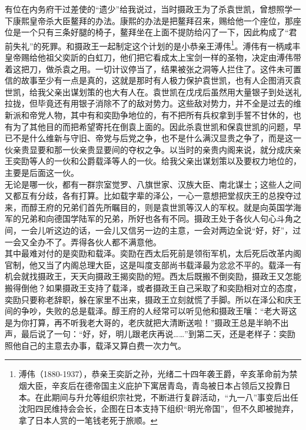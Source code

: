 有位在内务府干过差使的“遗少”给我说过，当时摄政王为了杀袁世凯，曾想照学一下康熙皇帝杀大臣鳌拜的办法。康熙的办法是把鳌拜召来，赐给他一个座位，那座位是一个只有三条好腿的椅子，鳌拜坐在上面不提防给闪了一下，因此构成了“君前失礼”的死罪。和摄政王一起制定这个计划的是小恭亲王溥伟\footnote{溥伟（1880-1937），恭亲王奕訢之孙，光绪二十四年袭王爵，辛亥革命前为禁烟大臣，辛亥后在德帝国主义庇护下寓居青岛，青岛被日本占领后又投靠日本。在此期间与升允等组织宗社党，不断进行复辟活动，“九一八”事变后出任沈阳四民维持会会长，企图在日本支持下组织“明光帝国”，但不久即被抛弃，拿了日本人赏的一笔钱老死于旅顺。}。溥伟有一柄咸丰皇帝赐给他祖父奕訢的白虹刀，他们把它看成太上宝剑一样的圣物，决定由溥伟带着这把刀，做杀袁之用。一切计议停当了，结果被张之洞等人拦住了。这件未可置信的故事至少有一点是真的，这就是那时有人极力保护袁世凯，也有人企图消灭袁世凯，给我父亲出谋划策的也大有人在。袁世凯在戊戌后虽然用大量银子到处送礼拉拢，但毕竟还有用银子消除不了的敌对势力。这些敌对势力，并不全是过去的维新派和帝党人物，其中有和奕劻争地位的，有不把所有兵权拿到手誓不甘休的，也有为了其他目的而把希望寄托在倒袁上面的。因此杀袁世凯和保袁世凯的问题，早已不是什么维新与守旧、帝党与后党之争，也不是什么满汉显贵之争了，而是这一伙亲贵显要和那一伙亲贵显要间的夺权之争。以当时的亲贵内阁来说，就分成庆亲王奕劻等人的一伙和公爵载泽等人的一伙。给我父亲出谋划策以及要权力地位的，主要是后面这一伙。\\

无论是哪一伙，都有一群宗室觉罗、八旗世家、汉族大臣、南北谋士；这些人之间又都互有分歧，各有打算。比如载字辈的泽公，一心一意想把堂叔庆王的总揆夺过来，而醇王府的兄弟们首先所瞩目的，则是袁世凯等汉人的军权。就是向英国学海军的兄弟和向德国学陆军的兄弟，所好也各有不同。摄政王处于各伙人句心斗角之间，一会儿听这边的话，一会儿又信另一边的主意，一会对两边全说“好，好”，过一会又全办不了。弄得各伙人都不满意他。\\

其中最难对付的是奕劻和载泽。奕劻在西太后死前是领衔军机，太后死后改革内阁官制，他又当了内阁总理大臣，这是叫度支部尚书载泽最为忿忿不平的。载泽一有机会就找摄政王，天天向摄政王揭奕劻的短。西太后既搬不倒奕劻，摄政王又怎能搬得倒他？如果摄政王支持了载泽，或者摄政王自己采取了和奕劻相对立的态度，奕劻只要称老辞职，躲在家里不出来，摄政王立刻就慌了手脚。所以在泽公和庆王间的争吵，失败的总是载泽。醇王府的人经常可以听见他和摄政王嚷：“老大哥这是为你打算，再不听我老大哥的，老庆就把大清断送啦！”摄政王总是半晌不出声，最后说了一句：“好，好，明儿跟老庆再说……”到第二天，还是老样子：奕劻照他自己的主意去办事，载泽又算白费一次力气。\\

